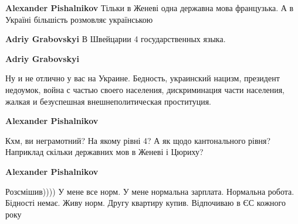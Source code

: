 \begin{itemize}
\begin{itemize}
\textbf{Alexander Pishalnikov} Тільки в Женеві одна державна мова французька. А в Україні більшість розмовляє українською

 
\textbf{Adriy Grabovskyi} В Швейцарии 4 государственных языка.

 
\textbf{Adriy Grabovskyi} 

Ну и не отлично у вас на Украине. Бедность, украинский нацизм, президент
недоумок, война с частью своего населения, дискриминация части населения,
жалкая и безуспешная внешнеполитическая проституция.


 
\textbf{Alexander Pishalnikov} 

Кхм, ви неграмотний? На якому рівні 4? А як щодо кантонального рівня? Наприклад
скільки державних мов в Женеві і Цюриху?


 
\textbf{Alexander Pishalnikov} 

Розсмішив)))) У мене все норм. У мене нормальна зарплата. Нормальна робота.
Бідності немає. Живу норм. Другу квартиру купив. Відпочиваю в ЄС кожного року

 

\end{itemize}
\end{itemize}
